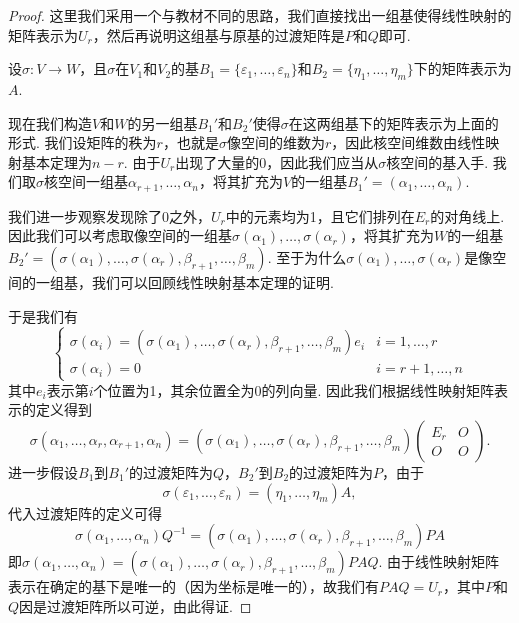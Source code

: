 \begin{proof}
    这里我们采用一个与教材不同的思路，我们直接找出一组基使得线性映射的矩阵表示为$U_r$，然后再说明这组基与原基的过渡矩阵是$P$和$Q$即可.

    设$\sigma:V\to W$，且$\sigma$在$V_1$和$V_2$的基$B_1=\{\varepsilon_1,\ldots,\varepsilon_n\}$和$B_2=\{\eta_1,\ldots,\eta_m\}$下的矩阵表示为$A$.

    现在我们构造$V$和$W$的另一组基$B_1'$和$B_2'$使得$\sigma$在这两组基下的矩阵表示为上面的形式. 我们设矩阵的秩为$r$，也就是$\sigma$像空间的维数为$r$，因此核空间维数由线性映射基本定理为$n-r$. 由于$U_r$出现了大量的0，因此我们应当从$\sigma$核空间的基入手. 我们取$\sigma$核空间一组基$\alpha_{r+1},\ldots,\alpha_n$，将其扩充为$V$的一组基$B_1'=(\alpha_1,\ldots,\alpha_n)$.

    我们进一步观察发现除了0之外，$U_r$中的元素均为1，且它们排列在$E_r$的对角线上. 因此我们可以考虑取像空间的一组基$\sigma(\alpha_1),\ldots,\sigma(\alpha_r)$，将其扩充为$W$的一组基$B_2'=(\sigma(\alpha_1),\ldots,\sigma(\alpha_r),\beta_{r+1},\ldots,\beta_m)$. 至于为什么$\sigma(\alpha_1),\ldots,\sigma(\alpha_r)$是像空间的一组基，我们可以回顾线性映射基本定理的证明.

    于是我们有
    \[\begin{cases}
            \sigma(\alpha_i)=(\sigma(\alpha_1),\ldots,\sigma(\alpha_r),\beta_{r+1},\ldots,\beta_m)e_i & i=1,\ldots,r   \\
            \sigma(\alpha_i)=0                                                                        & i=r+1,\ldots,n
        \end{cases}\]
    其中$e_i$表示第$i$个位置为1，其余位置全为0的列向量. 因此我们根据线性映射矩阵表示的定义得到
    \[\sigma(\alpha_1,\ldots,\alpha_r,\alpha_{r+1},\alpha_n)=(\sigma(\alpha_1),\ldots,\sigma(\alpha_r),\beta_{r+1},\ldots,\beta_m)\begin{pmatrix}
            E_r & O \\ O & O
        \end{pmatrix}.\]
    进一步假设$B_1$到$B_1'$的过渡矩阵为$Q$，$B_2'$到$B_2$的过渡矩阵为$P$，由于
    \[\sigma(\varepsilon_1,\ldots,\varepsilon_n)=(\eta_1,\ldots,\eta_m)A,\]
    代入过渡矩阵的定义可得
    \[\sigma(\alpha_1,\ldots,\alpha_n)Q^{-1}=(\sigma(\alpha_1),\ldots,\sigma(\alpha_r),\beta_{r+1},\ldots,\beta_m)PA\]
    即$\sigma(\alpha_1,\ldots,\alpha_n)=(\sigma(\alpha_1),\ldots,\sigma(\alpha_r),\beta_{r+1},\ldots,\beta_m)PAQ$. 由于线性映射矩阵表示在确定的基下是唯一的（因为坐标是唯一的），故我们有$PAQ=U_r$，其中$P$和$Q$因是过渡矩阵所以可逆，由此得证.
\end{proof}

